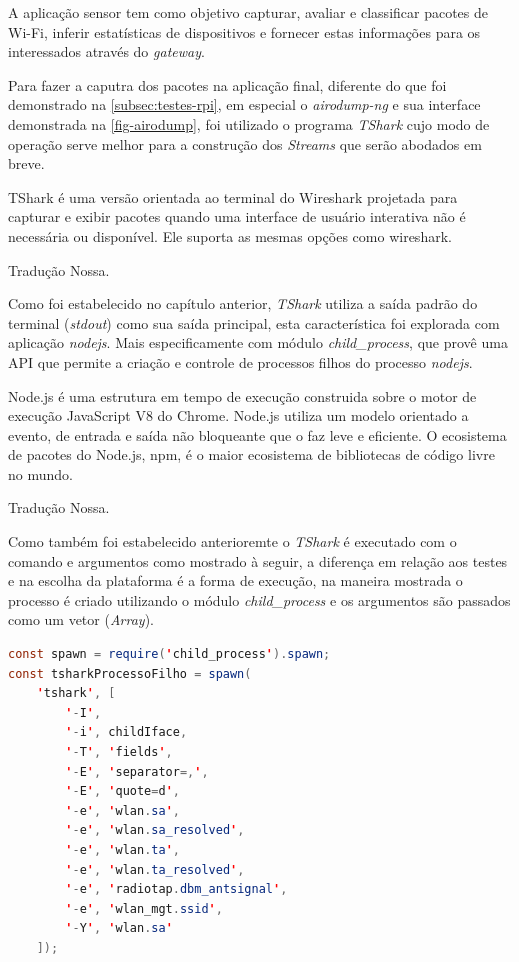 A aplicação sensor tem como objetivo capturar, avaliar e classificar pacotes de
Wi-Fi, inferir estatísticas de dispositivos e fornecer estas informações para
os interessados através do \emph{gateway}.

Para fazer a caputra dos pacotes na aplicação final, diferente do que foi
demonstrado na \autoref{subsec:testes-rpi}, em especial o \emph{airodump-ng} e
sua interface demonstrada na \autoref{fig-airodump}, foi utilizado o programa
\emph{TShark} cujo modo de operação serve melhor para a construção dos
\emph{Streams} que serão abodados em breve.

\begin{citacao}

	TShark é uma versão orientada ao terminal do Wireshark projetada para capturar
	e exibir pacotes quando uma interface de usuário interativa não é necessária ou
	disponível. Ele suporta as mesmas opções como wireshark. \

	 Tradução Nossa.
\end{citacao}

Como foi estabelecido no capítulo anterior, \emph{TShark}  utiliza a saída
padrão  do terminal (\emph{stdout}) como sua saída principal, esta
característica foi explorada com aplicação \emph{nodejs}. Mais especificamente
com módulo \emph{child\_process},  que provê uma API que permite a criação e
controle de processos filhos do processo \emph{nodejs}.

\begin{citacao}

	Node.js é uma estrutura em tempo de execução construida sobre o motor de
	execução JavaScript V8 do Chrome. Node.js utiliza um modelo orientado a
	evento, de entrada e saída não bloqueante que o faz leve e eficiente.
	O ecosistema de pacotes do Node.js, npm, é o maior ecosistema de bibliotecas
	de código livre no mundo. \

	 Tradução Nossa.
\end{citacao}

Como também foi estabelecido anterioremte o \emph{TShark} é executado com o
comando e argumentos como mostrado à seguir, a diferença em relação aos testes e
na escolha da plataforma é a forma de execução, na maneira mostrada o processo é
criado utilizando o módulo \emph{child\_process} \cite{child_process} e os
argumentos são passados como um vetor (\emph{Array}).

\begin{lstlisting}[language=java]
const spawn = require('child_process').spawn;
const tsharkProcessoFilho = spawn(
	'tshark', [
		'-I',
		'-i', childIface,
		'-T', 'fields',
		'-E', 'separator=,',
		'-E', 'quote=d',
		'-e', 'wlan.sa',
		'-e', 'wlan.sa_resolved',
		'-e', 'wlan.ta',
		'-e', 'wlan.ta_resolved',
		'-e', 'radiotap.dbm_antsignal',
		'-e', 'wlan_mgt.ssid',
		'-Y', 'wlan.sa'
	]);
\end{lstlisting}


